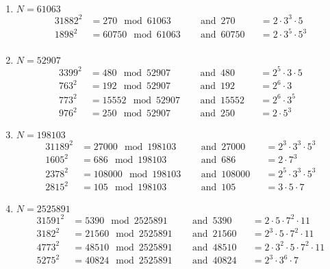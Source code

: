 \documentclass[12pt]{amsart}
\theoremstyle{definition}
\begin{document}
\begin{enumerate}
\begin{enumerate}
	\end{enumerate}
		

		\begin{enumerate}
			\item $N = 61063$ 
			\begin{alignat*}{3}
				1882^2 & = 270 \mod 61063~ && \operatorname{and}~
				270 && = 2 \cdot 3^3 \cdot 5 \\
				1898^2 & = 60750 \mod 61063~ && \operatorname{and}~ 
				60750 && = 2 \cdot 3^5 \cdot 5^3  \\
			\end{alignat*}
			\item $N = 52907$
			\begin{alignat*}{3}
				399^2 & = 480 \mod 52907~ && \operatorname{and}~
				480 && = 2^5 \cdot 3 \cdot 5 \\
				763^2 & = 192 \mod 52907~ && \operatorname{and}~
				192 && = 2^6 \cdot 3 \\ 
				773^2 & = 15552 \mod 52907~ && \operatorname{and}~
				15552 && = 2^6 \cdot 3^5 \\
				976^2 & = 250 \mod 52907~ && \operatorname{and}~
				250 && = 2 \cdot 5^3 
			\end{alignat*}
			\item $N = 198103$
			\begin{alignat*}{3}
				1189^2 & = 27000 \mod 198103~ && \operatorname{and}~
				27000 && = 2^3 \cdot 3^3 \cdot 5^3 \\
				1605^2 & = 686 \mod 198103~ && \operatorname{and}~
				686 && = 2 \cdot 7^3 \\ 
				2378^2 & = 108000 \mod 198103~ && \operatorname{and}~
				108000 && = 2^5 \cdot 3^3 \cdot 5^3 \\
				2815^2 & = 105 \mod 198103~ && \operatorname{and}~
				105 && = 3 \cdot 5 \cdot 7
			\end{alignat*}
			\item $N = 2525891$
			\begin{alignat*}{3}
				1591^2 & = 5390 \mod 2525891~ && \operatorname{and}~
				5390 && = 2 \cdot 5 \cdot 7^2 \cdot 11 \\
				3182^2 & = 21560 \mod 2525891~ && \operatorname{and}~
				21560 && = 2^3 \cdot 5 \cdot 7^2 \cdot 11 \\ 
				4773^2 & = 48510 \mod 2525891~ && \operatorname{and}~
				48510 && = 2 \cdot 3^2 \cdot 5 \cdot 7^2 \cdot 11 \\
				5275^2 & = 40824 \mod 2525891~ && \operatorname{and}~
				40824 && = 2^3 \cdot 3^6 \cdot 7 \\

\end{alignat*}
\end{enumerate}
\end{enumerate}
\end{document}
